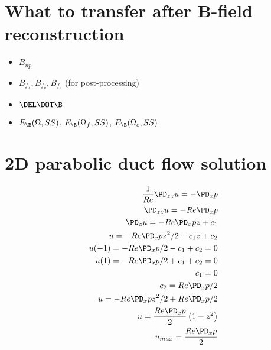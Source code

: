 \documentclass[11pt]{article}
\begin{document}
\section{What to transfer after B-field reconstruction}
\begin{itemize}
\item $B_{np}$
\item $B_{f_x},B_{f_y},B_{f_z}$ (for post-processing)
\item $\DEL \DOT \B$
\item $E_{\B}(\Omega,SS)$, $E_{\B}(\Omega_f,SS)$, $E_{\B}(\Omega_c,SS)$
\end{itemize}

\section{2D parabolic duct flow solution}
\begin{equation}\begin{aligned}
	\frac{1}{Re}\PD_{zz} u = - \PD_x p \\
	\PD_{zz} u = - Re \PD_x p \\
	\PD_{z} u = - Re \PD_x p z + c_1 \\
	u = - Re \PD_x p z^2/2 + c_1 z + c_2\\
	u(-1) = - Re \PD_x p /2 - c_1 + c_2 = 0\\
	u(1)  = - Re \PD_x p /2 + c_1 + c_2 = 0\\
	c_1 = 0 \\
	c_2 = Re \PD_x p /2 \\
	u = - Re \PD_x p z^2/2 + Re \PD_x p /2 \\
	u = \frac{Re \PD_x p}{2} \left(1-z^2 \right) \\
	u_{max} = \frac{Re \PD_x p}{2} \\
\end{aligned}\end{equation}
\end{document}
